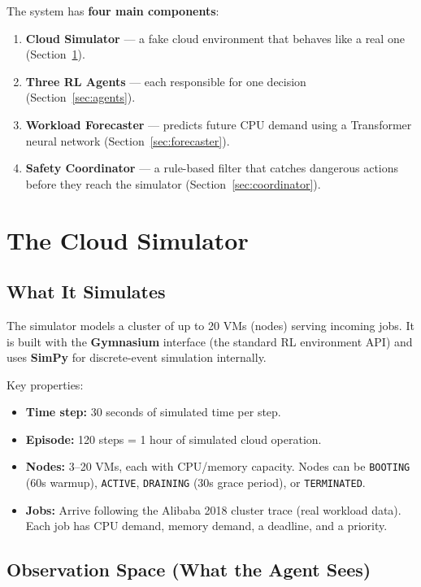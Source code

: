 \documentclass[11pt,a4paper]{article}
\begin{document}
\medskip
\noindent
The system has \textbf{four main components}:
\begin{enumerate}[leftmargin=2em]
  \item \textbf{Cloud Simulator} --- a fake cloud environment that behaves
        like a real one (Section~\ref{sec:simulator}).
  \item \textbf{Three RL Agents} --- each responsible for one decision
        (Section~\ref{sec:agents}).
  \item \textbf{Workload Forecaster} --- predicts future CPU demand using a
        Transformer neural network (Section~\ref{sec:forecaster}).
  \item \textbf{Safety Coordinator} --- a rule-based filter that catches
        dangerous actions before they reach the simulator
        (Section~\ref{sec:coordinator}).
\end{enumerate}


\section{The Cloud Simulator}\label{sec:simulator}


\subsection{What It Simulates}

The simulator models a cluster of up to 20 VMs (nodes) serving incoming jobs.
It is built with the \textbf{Gymnasium} interface (the standard RL environment API)
and uses \textbf{SimPy} for discrete-event simulation internally.

Key properties:
\begin{itemize}[leftmargin=2em]
  \item \textbf{Time step:} 30 seconds of simulated time per step.
  \item \textbf{Episode:} 120 steps = 1 hour of simulated cloud operation.
  \item \textbf{Nodes:} 3--20 VMs, each with CPU/memory capacity. Nodes can be
        \texttt{BOOTING} (60s warmup), \texttt{ACTIVE}, \texttt{DRAINING}
        (30s grace period), or \texttt{TERMINATED}.
  \item \textbf{Jobs:} Arrive following the Alibaba 2018 cluster trace
        (real workload data). Each job has CPU demand, memory demand, a
        deadline, and a priority.
\end{itemize}

\subsection{Observation Space (What the Agent Sees)}
\end{document}

